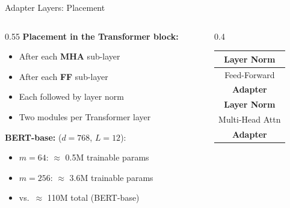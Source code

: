 \documentclass[11pt,compress,t,notes=noshow, xcolor=table]{beamer}
\begin{document}

\begin{frame}{Adapter Layers: Placement}

\vfill

\begin{columns}[T]
\begin{column}{0.55\textwidth}
\textbf{Placement in the Transformer block:}
\begin{itemize}
  \item After each \textbf{MHA} sub-layer
  \item After each \textbf{FF} sub-layer
  \item Each followed by layer norm
  \item Two modules per Transformer layer
\end{itemize}

\vfill

\textbf{BERT-base:} ($d = 768$, $L = 12$):
\begin{itemize}
  \item $m = 64$: $\approx$ 0.5M trainable params
  \item $m = 256$: $\approx$ 3.6M trainable params
  \item vs.\ $\approx$ 110M total (BERT-base)
\end{itemize}
\end{column}
\begin{column}{0.4\textwidth}
\vspace{1.7cm}
\begin{center}
\begin{tabular}{|c|}
\hline
\textbf{Layer Norm} \\
\hline
Feed-Forward \\
\hline
\cellcolor{blue!20}\textbf{Adapter} \\
\hline
\textbf{Layer Norm} \\
\hline
Multi-Head Attn \\
\hline
\cellcolor{blue!20}\textbf{Adapter} \\
\hline
\end{tabular}
\end{center}
\end{column}
\end{columns}

\vfill

\end{frame}

\end{document}
